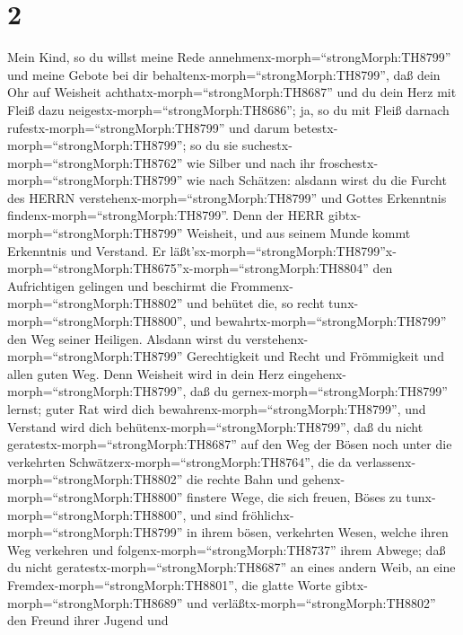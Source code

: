 \hypertarget{section-1}{%
\section{2}\label{section-1}}

 Mein Kind, so du willst meine Rede
annehmenx-morph=``strongMorph:TH8799'' und meine Gebote bei dir
behaltenx-morph=``strongMorph:TH8799'',  daß dein Ohr auf
Weisheit achthatx-morph=``strongMorph:TH8687'' und du dein Herz mit
Fleiß dazu neigestx-morph=``strongMorph:TH8686'';  ja, so du
mit Fleiß darnach rufestx-morph=``strongMorph:TH8799'' und darum
betestx-morph=``strongMorph:TH8799'';  so du sie
suchestx-morph=``strongMorph:TH8762'' wie Silber und nach ihr
froschestx-morph=``strongMorph:TH8799'' wie nach Schätzen: 
alsdann wirst du die Furcht des HERRN
verstehenx-morph=``strongMorph:TH8799'' und Gottes Erkenntnis
findenx-morph=``strongMorph:TH8799''.  Denn der HERR
gibtx-morph=``strongMorph:TH8799'' Weisheit, und aus seinem Munde kommt
Erkenntnis und Verstand.  Er
läßt'sx-morph=``strongMorph:TH8799''\textbar x-morph=``strongMorph:TH8675''x-morph=``strongMorph:TH8804''
den Aufrichtigen gelingen und beschirmt die
Frommenx-morph=``strongMorph:TH8802''  und behütet die, so
recht tunx-morph=``strongMorph:TH8800'', und
bewahrtx-morph=``strongMorph:TH8799'' den Weg seiner Heiligen.
 Alsdann wirst du verstehenx-morph=``strongMorph:TH8799''
Gerechtigkeit und Recht und Frömmigkeit und allen guten Weg.
 Denn Weisheit wird in dein Herz
eingehenx-morph=``strongMorph:TH8799'', daß du
gernex-morph=``strongMorph:TH8799'' lernst;  guter Rat wird
dich bewahrenx-morph=``strongMorph:TH8799'', und Verstand wird dich
behütenx-morph=``strongMorph:TH8799'',  daß du nicht
geratestx-morph=``strongMorph:TH8687'' auf den Weg der Bösen noch unter
die verkehrten Schwätzerx-morph=``strongMorph:TH8764'', 
die da verlassenx-morph=``strongMorph:TH8802'' die rechte Bahn und
gehenx-morph=``strongMorph:TH8800'' finstere Wege,  die
sich freuen, Böses zu tunx-morph=``strongMorph:TH8800'', und sind
fröhlichx-morph=``strongMorph:TH8799'' in ihrem bösen, verkehrten Wesen,
 welche ihren Weg verkehren und
folgenx-morph=``strongMorph:TH8737'' ihrem Abwege;  daß du
nicht geratestx-morph=``strongMorph:TH8687'' an eines andern Weib, an
eine Fremdex-morph=``strongMorph:TH8801'', die glatte Worte
gibtx-morph=``strongMorph:TH8689''  und
verläßtx-morph=``strongMorph:TH8802'' den Freund ihrer Jugend und
